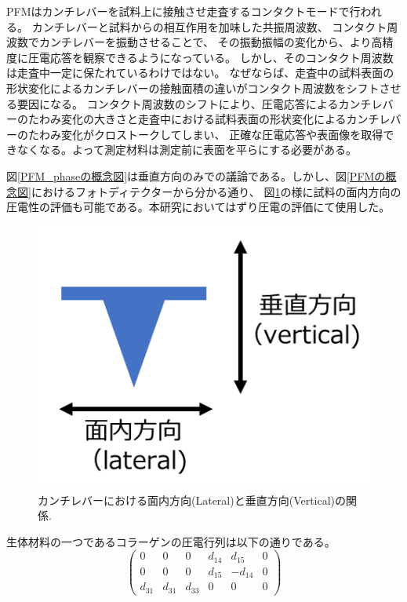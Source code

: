 \documentclass[dvipdfmx,12pt,a4paper]{jreport}
\begin{document}
		PFMはカンチレバーを試料上に接触させ走査するコンタクトモードで行われる。
		カンチレバーと試料からの相互作用を加味した共振周波数、
		コンタクト周波数でカンチレバーを振動させることで、
		その振動振幅の変化から、より高精度に圧電応答を観察できるようになっている。
		しかし、そのコンタクト周波数は走査中一定に保たれているわけではない。
		なぜならば、走査中の試料表面の形状変化によるカンチレバーの接触面積の違いがコンタクト周波数をシフトさせる要因になる。
		コンタクト周波数のシフトにより、圧電応答によるカンチレバーのたわみ変化の大きさと走査中における試料表面の形状変化によるカンチレバーのたわみ変化がクロストークしてしまい、
		正確な圧電応答や表面像を取得できなくなる。よって測定材料は測定前に表面を平らにする必要がある。
		
		図\ref{PFM_phaseの概念図}は垂直方向のみでの議論である。しかし、図\ref{PFMの概念図}におけるフォトディテクターから分かる通り、
		図\ref{面内と垂直の概念図}の様に試料の面内方向の圧電性の評価も可能である。本研究においてはずり圧電の評価にて使用した。
		\begin{figure}[h]
			\centering
			\includegraphics[scale=0.7]{lateral_vertical.png}
			\caption{カンチレバーにおける面内方向(Lateral)と垂直方向(Vertical)の関係.}
			\label{面内と垂直の概念図}
		\end{figure}
		\newpage
		生体材料の一つであるコラーゲンの圧電行列は以下の通りである。
		\begin{equation}
			\left(
		\begin{array}{cccccc}
			0&0&0&d_{14}&d_{15}&0 \\
			0&0&0&d_{15}&-d_{14}&0 \\
			d_{31}&d_{31}&d_{33}&0&0&0
		\end{array}\right)
	\end{equation}
\end{document}
